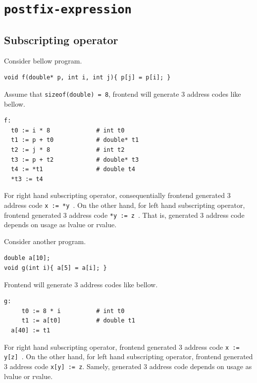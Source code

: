 \section{\tt{postfix-expression}}

\subsection{Subscripting operator}
\label{expr_e017}

Consider bellow program.
\begin{verbatim}
void f(double* p, int i, int j){ p[j] = p[i]; }
\end{verbatim}
Assume that {\tt{sizeof(double) = 8}},
frontend will generate 3 address codes like bellow.
\begin{verbatim}
f:
  t0 := i * 8             # int t0
  t1 := p + t0            # double* t1
  t2 := j * 8             # int t2
  t3 := p + t2            # double* t3
  t4 := *t1               # double t4
  *t3 := t4
\end{verbatim}
For right hand subscripting operator, 
consequentially frontend generated 3 address code {\tt{x := *y }}.
On the other hand, for left hand subscripting operator,
frontend generated 3 address code {\tt{*y := z }}.
That is, generated 3 address code depends on usage as lvalue or rvalue.

Consider another program.
\begin{verbatim}
double a[10];
void g(int i){ a[5] = a[i]; }
\end{verbatim}
Frontend will generate 3 address codes like bellow.
\begin{verbatim}
g:
     t0 := 8 * i          # int t0
     t1 := a[t0]          # double t1
  a[40] := t1
\end{verbatim}
For right hand subscripting operator, 
frontend generated 3 address code {\tt{x := y[z] }}.
On the other hand, for left hand subscripting operator,
frontend generated 3 address code {\tt{x[y] := z}}.
Samely, generated 3 address code depends on usage as lvalue or rvalue.

